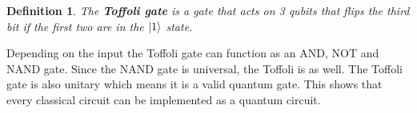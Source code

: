 \documentclass[12pt,twoside]{report}
\newtheorem{defn}[subsection]{Definition}
\begin{document}
\begin{defn}
    The \textbf{Toffoli gate} is a gate that acts on 3 qubits that flips the third bit if the first two are in the $\ket{1}$ state.\\
\end{defn}

Depending on the input the Toffoli gate can function as an AND, NOT and NAND gate. Since the NAND gate is universal, the Toffoli is as well. The Toffoli gate is also unitary which means it is a valid quantum gate. This shows that every classical circuit can be implemented as a quantum circuit.

\newpage
{}
\begin{thebibliography}{9}
        \lipsum[1][1-3]
        \lipsum[2][1-3]
        \lipsum[3][1-3]
        \lipsum[4][1-3]
        \lipsum[5][1-3]
        \lipsum[6][1-3]
\end{thebibliography}
\end{document}
